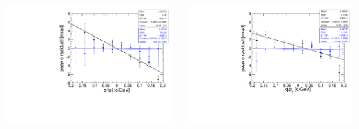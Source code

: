 \documentclass[compress]{beamer}
\begin{document}
\begin{frame}
\vfill
\begin{columns}
\includegraphics[width=\linewidth]{nocuts_jpsi_qoverpmag.pdf}

\includegraphics[width=\linewidth]{nocuts_jpsi_qoverpt.pdf}
\end{columns}
\end{frame}

\end{document}
